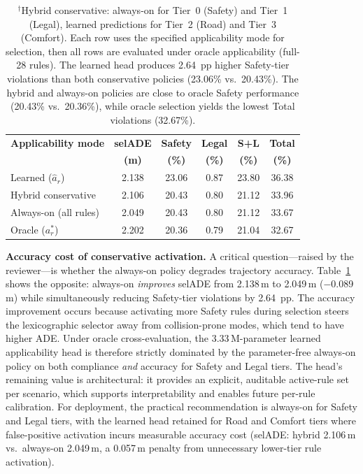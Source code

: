 \begin{table}[t]
\centering
\caption{Conservative Applicability Comparison (Cross-Evaluation: Mode-Specific Selection, Oracle Evaluation, Lexicographic, 43{,}219 Scenarios)}
\label{tab:conservative_applicability}
\setlength{\tabcolsep}{3pt}
\begin{tabular}{lccccc}
\toprule
\textbf{Applicability mode} & \textbf{selADE} & \textbf{Safety} & \textbf{Legal} & \textbf{S+L} & \textbf{Total} \\
 & \textbf{(m)} & \textbf{(\%)} & \textbf{(\%)} & \textbf{(\%)} & \textbf{(\%)} \\
\midrule
Learned ($\hat{a}_r$) & 2.138 & 23.06 & 0.87 & 23.80 & 36.38 \\
Hybrid conservative\rlap{$^{\dagger}$} & 2.106 & 20.43 & 0.80 & 21.12 & 33.96 \\
Always-on (all rules) & 2.049 & 20.43 & 0.80 & 21.12 & 33.67 \\
Oracle ($a_r^*$) & 2.202 & 20.36 & 0.79 & 21.04 & 32.67 \\
\bottomrule
\end{tabular}
\vspace{1mm}
\caption*{\footnotesize $^{\dagger}$Hybrid conservative: always-on for Tier~0 (Safety) and Tier~1 (Legal), learned predictions for Tier~2 (Road) and Tier~3 (Comfort).  Each row uses the specified applicability mode for selection, then all rows are evaluated under oracle applicability (full-28 rules).  The learned head produces 2.64~pp higher Safety-tier violations than both conservative policies (23.06\% vs.\ 20.43\%).  The hybrid and always-on policies are close to oracle Safety performance (20.43\% vs.\ 20.36\%), while oracle selection yields the lowest Total violations (32.67\%).}
\end{table}

\noindent\textbf{Accuracy cost of conservative activation.}  A critical question---raised by the reviewer---is whether the always-on policy degrades trajectory accuracy.  Table~\ref{tab:conservative_applicability} shows the opposite: always-on \emph{improves} selADE from 2.138\,m to 2.049\,m ($-$0.089\,m) while simultaneously reducing Safety-tier violations by 2.64~pp.  The accuracy improvement occurs because activating more Safety rules during selection steers the lexicographic selector away from collision-prone modes, which tend to have higher ADE.  Under oracle cross-evaluation, the 3.33\,M-parameter learned applicability head is therefore strictly dominated by the parameter-free always-on policy on both compliance \emph{and} accuracy for Safety and Legal tiers.  The head's remaining value is architectural: it provides an explicit, auditable active-rule set per scenario, which supports interpretability and enables future per-rule calibration.  For deployment, the practical recommendation is always-on for Safety and Legal tiers, with the learned head retained for Road and Comfort tiers where false-positive activation incurs measurable accuracy cost (selADE: hybrid 2.106\,m vs.\ always-on 2.049\,m, a 0.057\,m penalty from unnecessary lower-tier rule activation).

